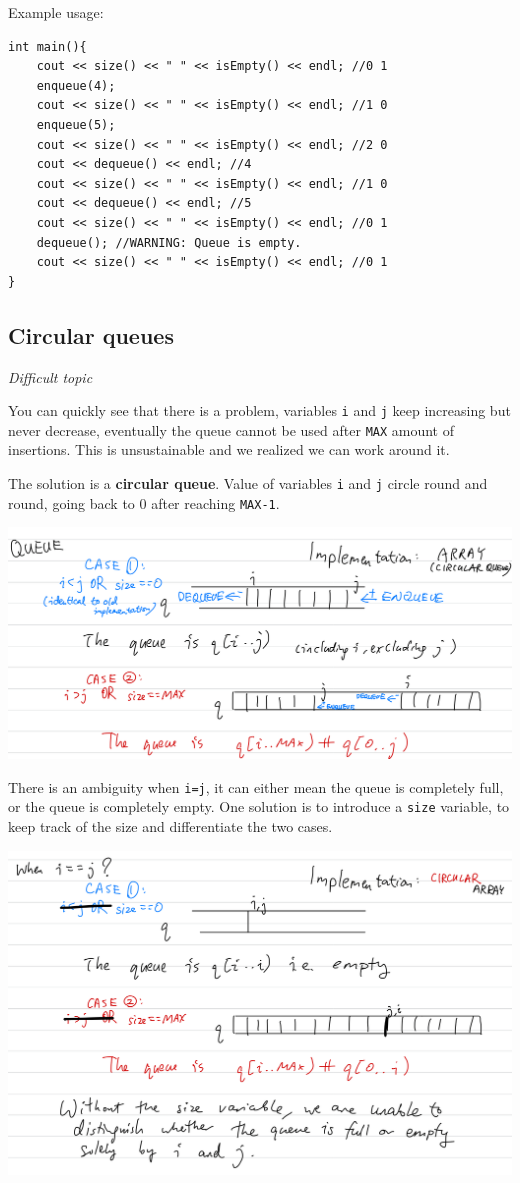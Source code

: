 Example usage:

\begin{lstlisting}
int main(){
    cout << size() << " " << isEmpty() << endl; //0 1
    enqueue(4);
    cout << size() << " " << isEmpty() << endl; //1 0
    enqueue(5);
    cout << size() << " " << isEmpty() << endl; //2 0
    cout << dequeue() << endl; //4
    cout << size() << " " << isEmpty() << endl; //1 0
    cout << dequeue() << endl; //5
    cout << size() << " " << isEmpty() << endl; //0 1
    dequeue(); //WARNING: Queue is empty.
    cout << size() << " " << isEmpty() << endl; //0 1
}
\end{lstlisting}

\subsection{Circular queues}

\textit{Difficult topic}


You can quickly see that there is a problem, variables \texttt{i} and \texttt{j} keep increasing but never decrease, eventually the queue cannot be used after \texttt{MAX} amount of insertions. This is unsustainable and we realized we can work around it.


The solution is a \textbf{circular queue}. Value of variables \texttt{i} and \texttt{j} circle round and round, going back to 0 after reaching \texttt{MAX-1}.

\includegraphics[width=15cm]{images/ch6-cq.png}

There is an ambiguity when \texttt{i=j}, it can either mean the queue is completely full, or the queue is completely empty. One solution is to introduce a \texttt{size} variable, to keep track of the size and differentiate the two cases.

\includegraphics[width=15cm]{images/ch6-cqij.png}

